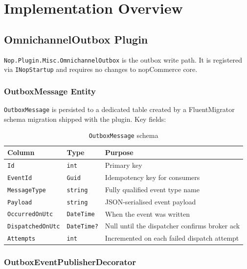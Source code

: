 \chapter{Implementation Overview}
\label{ch:implementation}

\section{OmnichannelOutbox Plugin}

\texttt{Nop.\-Plugin.\-Misc.\-Omnichannel\-Outbox} is the outbox write path. It is registered via \texttt{INopStartup} and requires no changes to nopCommerce core.

\subsection{OutboxMessage Entity}

\texttt{OutboxMessage} is persisted to a dedicated table created by a FluentMigrator schema migration shipped with the plugin. Key fields:

\begin{table}[H]
\centering
\caption{\texttt{OutboxMessage} schema}
\label{tab:outbox-schema}
\begin{tabularx}{\textwidth}{@{} L{4cm} L{2.5cm} X @{}}
\toprule
\textbf{Column} & \textbf{Type} & \textbf{Purpose} \\
\midrule
\texttt{Id} & \texttt{int} & Primary key \\
\texttt{EventId} & \texttt{Guid} & Idempotency key for consumers \\
\texttt{MessageType} & \texttt{string} & Fully qualified event type name \\
\texttt{Payload} & \texttt{string} & JSON-serialised event payload \\
\texttt{OccurredOnUtc} & \texttt{DateTime} & When the event was written \\
\texttt{DispatchedOnUtc} & \texttt{DateTime?} & Null until the dispatcher confirms broker ack \\
\texttt{Attempts} & \texttt{int} & Incremented on each failed dispatch attempt \\
\bottomrule
\end{tabularx}
\end{table}

\subsection{OutboxEventPublisherDecorator}

